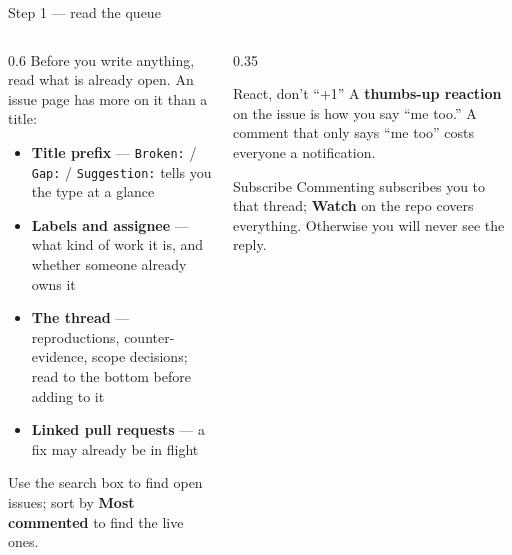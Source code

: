 \documentclass[9pt,aspectratio=169]{beamer}
\begin{document}
\begin{frame}{Step 1 --- read the queue}
    \begin{columns}[T]
        \begin{column}{0.6\textwidth}
            Before you write anything, read what is already open. An issue page has more on it than a title:
            \begin{itemize}\small
                \item \textbf{Title prefix} --- \texttt{Broken:} / \texttt{Gap:} / \texttt{Suggestion:} tells you the type at a glance
                \item \textbf{Labels and assignee} --- what kind of work it is, and whether someone already owns it
                \item \textbf{The thread} --- reproductions, counter-evidence, scope decisions; read to the bottom before adding to it
                \item \textbf{Linked pull requests} --- a fix may already be in flight
            \end{itemize}

            \medskip

            Use the search box to find open issues; sort by \textbf{Most commented} to find the live ones.
        \end{column}
        \begin{column}{0.35\textwidth}
            \begin{alertblock}{React, don't ``+1''}
                \small A \textbf{thumbs-up reaction} on the issue is how you say ``me too.'' A comment that only says ``me too'' costs everyone a notification.
            \end{alertblock}
            \begin{alertblock}{Subscribe}
                \small Commenting subscribes you to that thread; \textbf{Watch} on the repo covers everything. Otherwise you will never see the reply.
            \end{alertblock}
        \end{column}
    \end{columns}
\end{frame}
\end{document}
